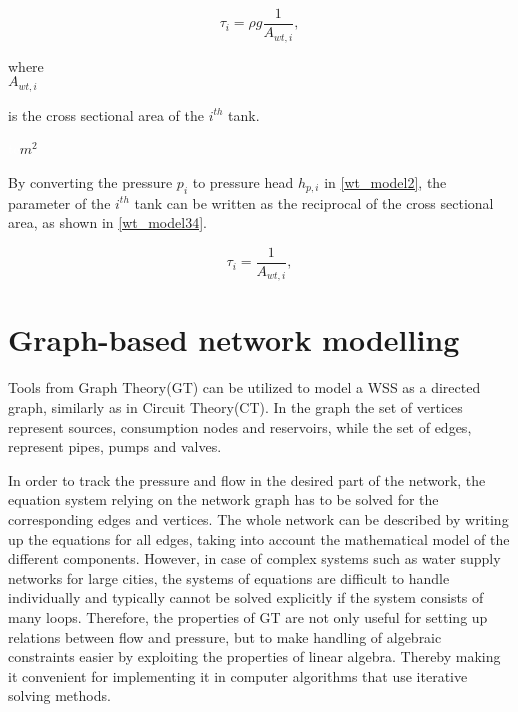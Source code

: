 \begin{equation}
\label{wt_model3}
\tau_i = \rho g \frac{1}{A_{wt,i}},
\end{equation}

 \begin{minipage}[t]{0.20\textwidth}
where\\
\hspace*{8mm} $A_{wt,i}$ 
\end{minipage}
\begin{minipage}[t]{0.68\textwidth}
\vspace*{2mm}
is the cross sectional area of the $i^{th}$ tank.
\end{minipage}
\begin{minipage}[t]{0.10\textwidth}
\vspace*{2mm}
\textcolor{White}{te}$\unit{m^2}$
\end{minipage} 

By converting the pressure $p_i$ to pressure head $h_{p,i}$ in \eqref{wt_model2}, the parameter of the $i^{th}$ tank can be written as the reciprocal of the cross sectional area, as shown in \eqref{wt_model34}.

\begin{equation}
\label{wt_model34}
\tau_i =\frac{1}{A_{wt,i}},
\end{equation}

\section{Graph-based network modelling}
\label{graph_based_network_modelling}

Tools from Graph Theory(GT) can be utilized to model a WSS as a directed graph, similarly as in Circuit Theory(CT). In the graph the set of vertices represent sources, consumption nodes and reservoirs, while the set of edges, represent pipes, pumps and valves. 

In order to track the pressure and flow in the desired part of the network, the equation system relying on the network graph has to be solved for the corresponding edges and vertices. The whole network can be described by writing up the equations for all edges, taking into account the mathematical model of the different components. However, in case of complex systems such as water supply networks for large cities, the systems of equations are difficult to handle individually and typically cannot be solved explicitly if the system consists of many loops. Therefore, the properties of GT are not only useful for setting up relations between flow and pressure, but to make handling of algebraic constraints easier by exploiting the properties of linear algebra. Thereby making it convenient for implementing it in computer algorithms that use iterative solving methods.  

